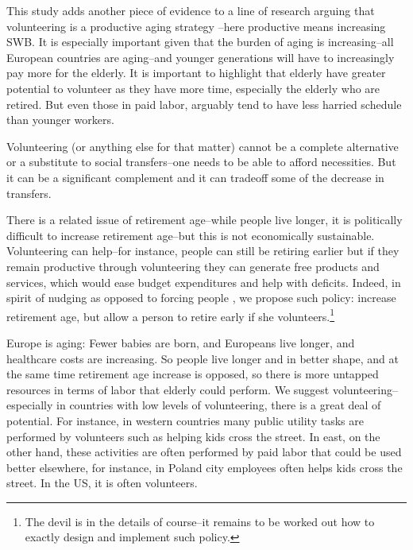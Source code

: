 \documentclass[10pt, letterpaper]{article}
\begin{document}
\begin{spacing}{1.4}
This study adds another piece of evidence to a line of research arguing that
volunteering is a productive aging strategy
\citep[e.g.,][]{wilson12B,hank09}--here productive means increasing SWB.
It is especially important given that the burden of aging %
 is increasing--all European countries are aging--and younger generations will
 have to increasingly pay more for the elderly. It is important to highlight that elderly have greater potential to volunteer as
they have more time, especially the elderly who are retired. But even those in
paid labor, arguably tend to have less harried schedule than younger workers.


Volunteering (or anything else for that matter) cannot be a complete alternative
or a substitute to social transfers--one needs to be able to afford necessities.
But it can be a significant complement and it can tradeoff some of the decrease in transfers.

There is a related issue of retirement age--while people live longer, it is
 politically difficult to increase retirement age--but this is not economically
 sustainable. Volunteering can help--for instance, people can still be retiring
 earlier but if they remain productive through volunteering they can generate
 free products and services, which would ease budget expenditures and help with
 deficits. Indeed, in spirit of nudging as opposed to forcing people
 \citep{thaler08}, we propose such policy: increase retirement age, but allow a
 person to retire early if she volunteers.\footnote{The devil is in the details
   of course--it remains to be worked out how to exactly design and implement
   such policy.}

Europe is aging: Fewer babies are born, and Europeans live longer, and healthcare
costs are increasing. So people live longer and in better shape, and at the same
time retirement age increase is opposed, so there is more untapped resources in
terms of labor that elderly could perform. We suggest volunteering--especially
in countries with low levels of volunteering, there is a great deal of potential.  
%
%
 For instance, in western countries many public utility tasks are performed by volunteers such
as helping kids cross the street. In east, on the other hand, these activities
are often performed by paid labor that could be used better elsewhere, for
instance, in Poland %
 city employees often helps kids cross the street. %
 In the US, it is often volunteers.


\end{spacing}
\end{document}
